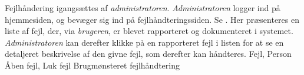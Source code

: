 {Fejlhåndering igangsættes af \textit{administratoren}. \textit{Administratoren} logger ind på hjemmesiden, og bevæger sig ind på fejlhåndteringssiden. Se . Her præsenteres en liste af  fejl, der, via \textit{brugeren}, er blevet rapporteret og dokumenteret i systemet. \textit{Administratoren} kan derefter klikke på en rapporteret fejl i listen for at se en detaljeret beskrivelse af den givne fejl, som derefter kan håndteres.}
{Fejl, Person}
{Åben fejl, Luk fejl}
{Brugmønsteret fejlhåndtering}
